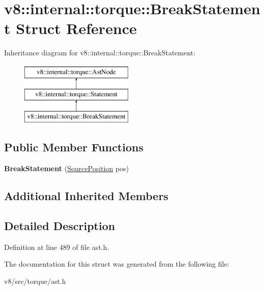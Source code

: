 \hypertarget{structv8_1_1internal_1_1torque_1_1BreakStatement}{}\section{v8\+:\+:internal\+:\+:torque\+:\+:Break\+Statement Struct Reference}
\label{structv8_1_1internal_1_1torque_1_1BreakStatement}
Inheritance diagram for v8\+:\+:internal\+:\+:torque\+:\+:Break\+Statement\+:\begin{figure}[H]
\begin{center}
\leavevmode
\includegraphics[height=3.000000cm]{structv8_1_1internal_1_1torque_1_1BreakStatement}
\end{center}
\end{figure}
\subsection*{Public Member Functions}
\begin{DoxyCompactItemize}
\item 
\mbox{\label{structv8_1_1internal_1_1torque_1_1BreakStatement_a030ba874664d9a104e182d592764263b}} 
{\bfseries Break\+Statement} (\mbox{\hyperlink{structv8_1_1internal_1_1torque_1_1SourcePosition}{Source\+Position}} pos)
\end{DoxyCompactItemize}
\subsection*{Additional Inherited Members}


\subsection{Detailed Description}


Definition at line 489 of file ast.\+h.



The documentation for this struct was generated from the following file\+:\begin{DoxyCompactItemize}
\item 
v8/src/torque/ast.\+h\end{DoxyCompactItemize}
